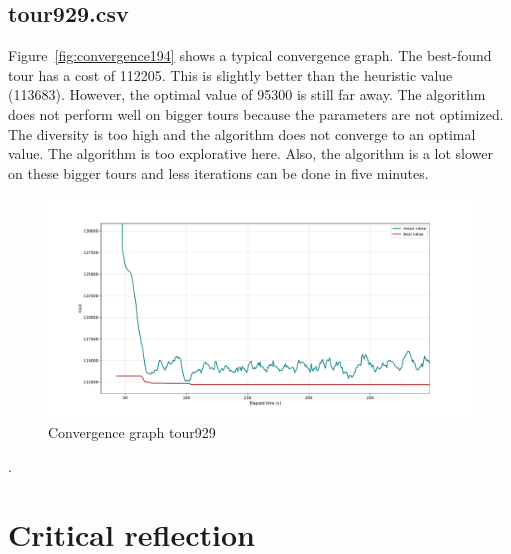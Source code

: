 \documentclass[a4paper,10pt]{article}
\newcommand{\ReplaceMe}[1]{{\color{blue}#1}}
\begin{document}
\subsection{tour929.csv}
Figure~\ref{fig:convergence194} shows a typical convergence graph. The best-found tour has a cost of 112205. This is slightly better than the heuristic value (113683). However, the optimal value of 95300 is still far away. The algorithm does not perform well on bigger tours because the parameters are not optimized. The diversity is too high and the algorithm does not converge to an optimal value. The algorithm is too explorative here. Also, the algorithm is a lot slower on these bigger tours and less iterations can be done in five minutes. 
\begin{figure}[H]
  \centering
  \includegraphics[width=.8\linewidth]{img/convergence929.pdf}
  \caption{Convergence graph tour929}
  \label{fig:convergence929}
\end{figure}.







\section{Critical reflection}
\end{document}
